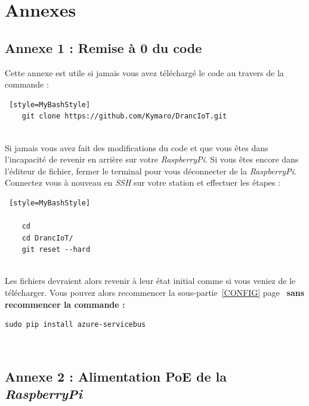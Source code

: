 \chapter*{Annexes}

\section*{Annexe 1 : Remise à 0 du code}
\label{ANNEXE1}
Cette annexe est utile si jamais vous avez téléchargé le code au travers de la commande : 

\begin{lstlisting} [style=MyBashStyle]
	git clone https://github.com/Kymaro/DrancIoT.git
\end{lstlisting}\\

Si jamais vous avez fait des modifications du code et que vous êtes dans l'incapacité de revenir en arrière sur votre \textit{RaspberryPi}. Si vous êtes encore dans l'éditeur de fichier, fermer le terminal pour vous déconnecter de la \textit{RaspberryPi}. Connectez vous à nouveau en \textit{SSH} sur votre station et effectuer les étapes :\\

\begin{lstlisting} [style=MyBashStyle]

	cd
	cd DrancIoT/
	git reset --hard
\end{lstlisting}\\

Les fichiers devraient alors revenir à leur état initial comme si vous veniez de le télécharger. Vous pouvez alors recommencer la sous-partie~\ref{CONFIG} page~\pageref{CONFIG} \textbf{sans recommencer la commande :}\\

\begin{lstlisting}[style=MyBashStyle]
	sudo pip install azure-servicebus
\end{lstlisting}\\


\section*{Annexe 2 : Alimentation PoE de la \textit{RaspberryPi}}
\\

